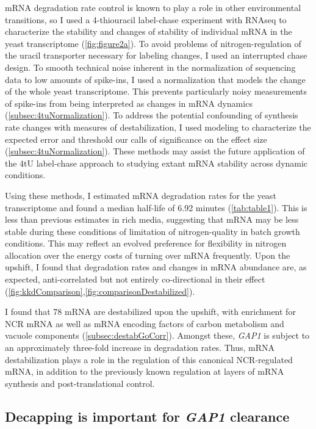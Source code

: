 mRNA degradation rate control is known to play a role in other
environmental transitions, so I used a 4-thiouracil label-chase
experiment with RNAseq to characterize the stability and changes
of stability of individual mRNA in the yeast transcriptome 
(\autoref{fig:figure2a}).
To avoid problems of nitrogen-regulation of the uracil transporter
necessary for labeling changes, I used an interrupted chase
design.
To smooth technical noise inherent in the normalization of sequencing
data to low amounts of spike-ins, I used a normalization that models
the change of the whole yeast transcriptome.
This prevents particularly noisy measurements of spike-ins from 
being interpreted as changes in mRNA dynamics 
(\autoref{subsec:4tuNormalization}).
To address the potential confounding of synthesis rate changes with
measures of destabilization, I used modeling to characterize the
expected error and threshold our calls of significance on the
effect size (\autoref{subsec:4tuNormalization}).
These methods may assist the future application of the 4tU label-chase
approach to studying extant mRNA stability across dynamic conditions.

Using these methods, I estimated mRNA degradation rates for the
yeast transcriptome and found a median half-life of 6.92 minutes
(\autoref{tab:table1}).
This is less than previous estimates in rich media, suggesting that
mRNA may be less stable during these conditions of limitation of
nitrogen-quality in batch growth conditions. This may reflect 
an evolved preference for flexibility in nitrogen allocation over
the energy costs of turning over mRNA frequently.
Upon the upshift,
I found that degradation rates and changes in
mRNA abundance are, as expected, anti-correlated but not entirely
co-directional in their effect
(\autoref{fig:kkdComparison},\autoref{fig:comparisonDestabilized}).

I found that 78 mRNA are destabilized upon the upshift, with
enrichment for NCR mRNA as well as mRNA encoding factors of carbon
metabolism and vacuole components (\autoref{subsec:destabGoCorr}). 
Amongst these, \textit{GAP1} is subject to an
approximately three-fold increase in degradation rates. 
Thus, mRNA destabilization plays a role in the regulation of this
canonical NCR-regulated mRNA, in addition to the previously known
regulation at layers of mRNA synthesis and post-translational
control.

\subsection{Decapping is important for \textit{GAP1} clearance}

